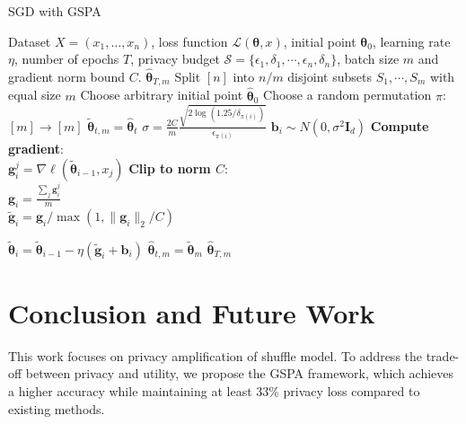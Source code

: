 \documentclass[letterpaper]{article} %
\begin{document}
\begin{algorithm}[h]
    \caption{SGD with GSPA}
    \label{alg:SGD}
    \renewcommand{\algorithmicrequire}{\textbf{Input:}}
    \renewcommand{\algorithmicensure}{\textbf{Output:}}
    \begin{algorithmic}[1]
        \REQUIRE Dataset $X = (x_1,\ldots,x_n)$, loss function $\mathcal{L}(\pmb \theta,x)$, initial point $\pmb \theta_0$, learning rate $\eta$, number of epochs $T$, privacy budget $\mathcal{S} = \{\epsilon_1, \delta_1, \cdots, \epsilon_n,\delta_n\}$,  batch size $m$ and gradient norm bound $C$. %
        \ENSURE $\hat{\pmb \theta}_{T,m}$   %
        \STATE
        Split $[n]$ into $n/m$ disjoint subsets $S_1, \cdots, S_m$ with equal size $m$
        \STATE Choose arbitrary initial point $ \hat{\pmb \theta}_{0}$
        \STATE Choose a random permutation $\pi$: $[m] \rightarrow [m]$
        \STATE $\tilde{\pmb\theta}_{t,m} = \hat{\pmb \theta}_{t}$
        \STATE $\sigma=\frac{2C}{m}\frac{\sqrt{2\log(1.25/\delta_{\pi(i)})}}{\epsilon_{\pi(i)}}$
            \STATE $\pmb b_i \sim N(0,\sigma^2 \pmb{I}_d)$
            \STATE \textbf{Compute gradient}:\\
            $\pmb g_i^{j} = \nabla \ell(\tilde{\pmb \theta}_{i-1},x_j)$
            \ENDFOR
            \STATE \textbf{Clip to norm $C$}:\\
            $\pmb g_i = \frac{\sum_j \pmb g_i^j}{m}$ \\
            $\tilde{\pmb g}_i =  {\pmb g_i} / \max(1,\| \pmb g_i \|_2/C)$
            
            \STATE $\tilde{\pmb \theta}_{i} = \tilde{\pmb \theta}_{i-1} - \eta ( \tilde{\pmb g}_i+\pmb b_i)$
        \ENDFOR
        \STATE $\hat{\pmb \theta}_{t,m} = \tilde{\pmb \theta}_m$
        \ENDFOR
        \RETURN $\hat{\pmb \theta}_{T,m}$
    \end{algorithmic}
\end{algorithm}
\section{Conclusion and Future Work}
This work focuses on privacy amplification of shuffle model. To address the trade-off between privacy and utility, we propose the GSPA framework, which achieves a higher accuracy while maintaining at least 33\% privacy loss compared to existing methods.
\end{document}
